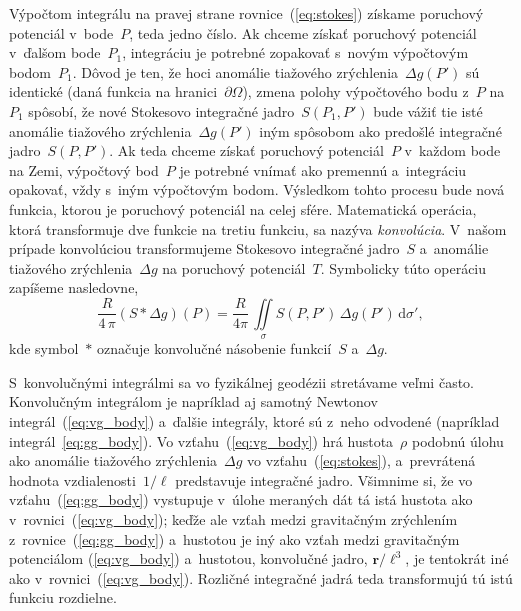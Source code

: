\documentclass[a4paper, 12pt]{book}
\newcommand{\diff}{\mathrm d}
\let\vec\mathbf
\begin{document}
Výpočtom integrálu na pravej strane rovnice~(\ref{eq:stokes}) získame poruchový 
potenciál v~bode~$P$, teda jedno číslo.  Ak chceme získať poruchový potenciál 
v~ďalšom bode~$P_1$, integráciu je potrebné zopakovať s~novým výpočtovým 
bodom~$P_1$.  Dôvod je ten, že hoci anomálie tiažového zrýchlenia~$\Delta 
g(P')$ sú identické (daná funkcia na hranici~$\partial\Omega$), zmena polohy 
výpočtového bodu z~$P$ na~$P_1$ spôsobí, že nové Stokesovo integračné 
jadro~$S(P_1, P')$ bude vážiť tie isté anomálie tiažového zrýchlenia~$\Delta 
g(P')$ iným spôsobom ako predošlé integračné jadro~$S(P, P')$.  Ak teda chceme 
získať poruchový potenciál~$P$ v~každom bode na Zemi, výpočtový bod~$P$ je 
potrebné vnímať ako premennú a~integráciu opakovať, vždy s~iným výpočtovým 
bodom.  Výsledkom tohto procesu bude nová funkcia, ktorou je poruchový 
potenciál na celej sfére.  Matematická operácia, ktorá transformuje dve funkcie 
na tretiu funkciu, sa nazýva \emph{konvolúcia}.  V~našom prípade konvolúciou 
transformujeme Stokesovo integračné jadro~$S$ a~anomálie tiažového 
zrýchlenia~$\Delta g$ na poruchový potenciál~$T$.  Symbolicky túto operáciu 
zapíšeme nasledovne,
%
\begin{equation}
\label{eq:stokes_convolution}
\frac{R}{4 \, \pi}(S * \Delta g)(P) = \frac{R}{4\pi} \, \iint\limits_\sigma 
S(P, P') \, \Delta g(P') \, \diff\sigma'{,}
\end{equation}
%
kde symbol~$*$ označuje konvolučné násobenie funkcií~$S$ a~$\Delta g$.

S~konvolučnými integrálmi sa vo fyzikálnej geodézii stretávame veľmi často.  
Konvolučným integrálom je napríklad aj samotný Newtonov 
integrál~(\ref{eq:vg_body}) a~ďalšie integrály, ktoré sú z~neho odvodené 
(napríklad integrál~\ref{eq:gg_body}).  Vo vzťahu~(\ref{eq:vg_body}) hrá 
hustota~$\rho$ podobnú úlohu ako anomálie tiažového zrýchlenia~$\Delta g$ vo 
vzťahu~(\ref{eq:stokes}), a~prevrátená hodnota vzdialenosti~$1 \slash \ell$ 
predstavuje integračné jadro.  Všimnime si, že vo vzťahu~(\ref{eq:gg_body}) 
vystupuje v~úlohe meraných dát tá istá hustota ako 
v~rovnici~(\ref{eq:vg_body}); keďže ale vzťah medzi gravitačným zrýchlením 
z~rovnice~(\ref{eq:gg_body}) a~hustotou je iný ako vzťah medzi gravitačným 
potenciálom (\ref{eq:vg_body}) a~hustotou, konvolučné jadro, $\vec r \slash 
\ell^3$, je tentokrát iné ako v~rovnici~(\ref{eq:vg_body}).  Rozličné 
integračné jadrá teda transformujú tú istú funkciu rozdielne.
\end{document}
